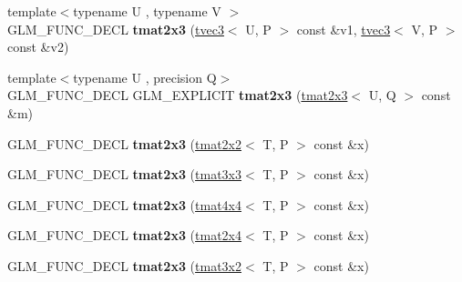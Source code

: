 \begin{DoxyCompactItemize}
\item 
\hypertarget{structglm_1_1tmat2x3_a7155a096b04a8577bbfc344a163b07c5}{{\footnotesize template$<$typename U , typename V $>$ }\\G\-L\-M\-\_\-\-F\-U\-N\-C\-\_\-\-D\-E\-C\-L {\bfseries tmat2x3} (\hyperlink{structglm_1_1tvec3}{tvec3}$<$ U, P $>$ const \&v1, \hyperlink{structglm_1_1tvec3}{tvec3}$<$ V, P $>$ const \&v2)}\label{structglm_1_1tmat2x3_a7155a096b04a8577bbfc344a163b07c5}

\item 
\hypertarget{structglm_1_1tmat2x3_a5cd6c10b4d3a99be39f63ccbcc57b210}{{\footnotesize template$<$typename U , precision Q$>$ }\\G\-L\-M\-\_\-\-F\-U\-N\-C\-\_\-\-D\-E\-C\-L G\-L\-M\-\_\-\-E\-X\-P\-L\-I\-C\-I\-T {\bfseries tmat2x3} (\hyperlink{structglm_1_1tmat2x3}{tmat2x3}$<$ U, Q $>$ const \&m)}\label{structglm_1_1tmat2x3_a5cd6c10b4d3a99be39f63ccbcc57b210}

\item 
\hypertarget{structglm_1_1tmat2x3_a3bc2693e1ce02cbd48703e2c7c6f75d6}{G\-L\-M\-\_\-\-F\-U\-N\-C\-\_\-\-D\-E\-C\-L {\bfseries tmat2x3} (\hyperlink{structglm_1_1tmat2x2}{tmat2x2}$<$ T, P $>$ const \&x)}\label{structglm_1_1tmat2x3_a3bc2693e1ce02cbd48703e2c7c6f75d6}

\item 
\hypertarget{structglm_1_1tmat2x3_a8c8c9b6b9ab00983351a4ffa5f1c1c80}{G\-L\-M\-\_\-\-F\-U\-N\-C\-\_\-\-D\-E\-C\-L {\bfseries tmat2x3} (\hyperlink{structglm_1_1tmat3x3}{tmat3x3}$<$ T, P $>$ const \&x)}\label{structglm_1_1tmat2x3_a8c8c9b6b9ab00983351a4ffa5f1c1c80}

\item 
\hypertarget{structglm_1_1tmat2x3_a8797fae4349161789ddaf71c932a1a49}{G\-L\-M\-\_\-\-F\-U\-N\-C\-\_\-\-D\-E\-C\-L {\bfseries tmat2x3} (\hyperlink{structglm_1_1tmat4x4}{tmat4x4}$<$ T, P $>$ const \&x)}\label{structglm_1_1tmat2x3_a8797fae4349161789ddaf71c932a1a49}

\item 
\hypertarget{structglm_1_1tmat2x3_a23808a1c5d5674c6ebb0486c2ae2fe81}{G\-L\-M\-\_\-\-F\-U\-N\-C\-\_\-\-D\-E\-C\-L {\bfseries tmat2x3} (\hyperlink{structglm_1_1tmat2x4}{tmat2x4}$<$ T, P $>$ const \&x)}\label{structglm_1_1tmat2x3_a23808a1c5d5674c6ebb0486c2ae2fe81}

\item 
\hypertarget{structglm_1_1tmat2x3_a2743481f193e33c3732697620ba9a0d7}{G\-L\-M\-\_\-\-F\-U\-N\-C\-\_\-\-D\-E\-C\-L {\bfseries tmat2x3} (\hyperlink{structglm_1_1tmat3x2}{tmat3x2}$<$ T, P $>$ const \&x)}\label{structglm_1_1tmat2x3_a2743481f193e33c3732697620ba9a0d7}


\end{DoxyCompactItemize}
